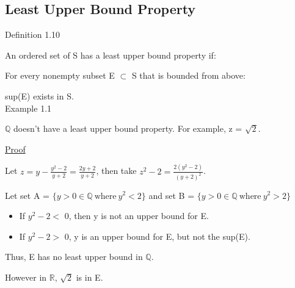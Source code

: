\subsection{Least Upper Bound Property}

{ \color{blue} Definition 1.10 }

\qquad An ordered set of S has a least upper bound property if:

\qquad \qquad For every nonempty subset E $ \subset $ S that is bounded from above:

\qquad \qquad \qquad sup(E) exists in S. \\

{ \color{red} Example 1.1 }

\qquad $ \mathbb{Q} $ doesn't have a least upper bound property. For example, z = $ \sqrt{2} $.

{\color{magenta} \underline{Proof}}

\qquad Let $ z = y - \frac{y^2-2}{y+2} = \frac{2y+2}{y+2} $, then take $ z^2-2 = \frac{2(y^2-2)}{(y+2)^2} $.

\qquad Let set A = $ \{ y > 0 \in \mathbb{Q} \ \text{where} \ y^2 < 2 \} $ and
set B = $ \{ y > 0 \in \mathbb{Q} \ \text{where} \ y^2 > 2 \} $

\begin{itemize}[leftmargin=2cm]
	\item If $ y^2-2 < $ 0, then y is not an upper bound for E.
	\item If $ y^2-2 > $ 0, y is an upper bound for E, but not the sup(E).
\end{itemize}

\qquad Thus, E has no least upper bound in $ \mathbb{Q} $.

\qquad However in $ \mathbb{R} $, $ \sqrt{2} $ is in E.
